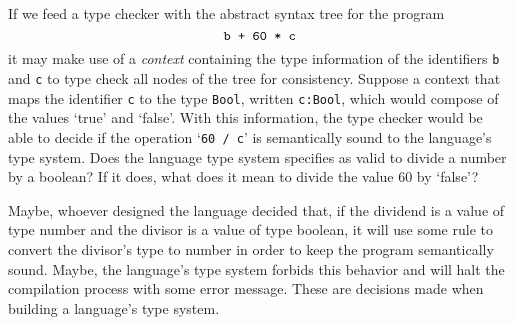 \documentclass[
  oneside,
  english,
  coorientadorbanca,
  embeddedlogo,
  noabntexcite
]{ufsc-thesis-rn46-2019}
\newcommand{\code}[1]{\texttt{#1}}
\begin{document}
If we feed a type checker with the abstract syntax tree for the program
\begin{equation*}
  \verb|b + 60 * c|
\end{equation*}
it may make use of a \textit{context} containing the type information of the identifiers \code{b} and \code{c} to type check all nodes of the tree for consistency.
Suppose a context that maps the identifier \code{c} to the type \code{Bool}, written \code{c:Bool}, which would compose of the values `true' and `false'.
With this information, the type checker would be able to decide if the operation `\verb+60 / c+' is semantically sound to the language's type system.
Does the language type system specifies as valid to divide a number by a boolean?
If it does, what does it mean to divide the value 60 by `false'?

Maybe, whoever designed the language decided that, if the dividend is a value of type number and the divisor is a value of type boolean, it will use some rule to convert the divisor's type to number in order to keep the program semantically sound.
Maybe, the language's type system forbids this behavior and will halt the compilation process with some error message.
These are decisions made when building a language's type system.
\end{document}
